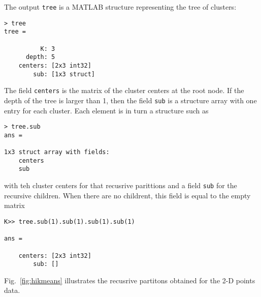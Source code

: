 \documentclass[9pt]{article}
\begin{document}
The output \verb$tree$ is a MATLAB structure representing the tree of
clusters:
\begin{verbatim}
> tree
tree =
 
          K: 3
      depth: 5
    centers: [2x3 int32]
        sub: [1x3 struct]
\end{verbatim}
The field \verb$centers$ is the matrix of the cluster centers at the
root node.  If the depth of the tree is larger than 1, then the field
\verb$sub$ is a structure array with one entry for each cluster. Each
element is in turn a structure such as
\begin{verbatim}
> tree.sub
ans = 

1x3 struct array with fields:
    centers
    sub
\end{verbatim}
with teh cluster centers for that recusrive parittions and a field
\verb$sub$ for the recursive children. When there are no childrent,
this field is equal to the empty matrix
\begin{verbatim}
K>> tree.sub(1).sub(1).sub(1).sub(1)

ans = 

    centers: [2x3 int32]
        sub: []
\end{verbatim}
Fig.~\ref{fig:hikmeans} illustrates the recusrive partitons obtained
for the 2-D points data.




\end{document}
